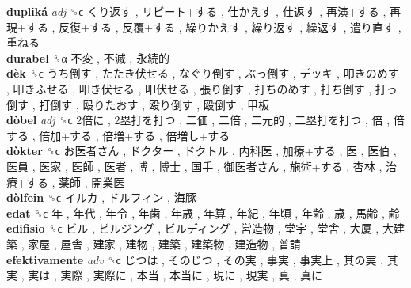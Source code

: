 \textbf{dupliká} \emph{adj}  ␝ϲ   くり返す ,  リピート+する ,  仕かえす ,  仕返す ,  再演+する ,  再現+する ,  反復+する ,  反覆+する ,  繰りかえす ,  繰り返す ,  繰返す ,  遣り直す ,  重ねる   \\
\textbf{durabel} ␝α   不変 ,  不滅 ,  永続的   \\
\textbf{dèk} ␝ϲ   うち倒す ,  たたき伏せる ,  なぐり倒す ,  ぶっ倒す ,  デッキ ,  叩きのめす ,  叩きふせる ,  叩き伏せる ,  叩伏せる ,  張り倒す ,  打ちのめす ,  打ち倒す ,  打っ倒す ,  打倒す ,  殴りたおす ,  殴り倒す ,  殴倒す ,  甲板   \\
\textbf{dòbel} \emph{adj}  ␝ϲ   2倍に ,  2塁打を打つ ,  二価 ,  二倍 ,  二元的 ,  二塁打を打つ ,  倍 ,  倍する ,  倍加+する ,  倍増+する ,  倍増し+する   \\
\textbf{dòkter} ␝ϲ   お医者さん ,  ドクター ,  ドクトル ,  内科医 ,  加療+する ,  医 ,  医伯 ,  医員 ,  医家 ,  医師 ,  医者 ,  博 ,  博士 ,  国手 ,  御医者さん ,  施術+する ,  杏林 ,  治療+する ,  薬師 ,  開業医   \\
\textbf{dòlfein} ␝ϲ   イルカ ,  ドルフィン ,  海豚   \\
\textbf{edat} ␝ϲ   年 ,  年代 ,  年令 ,  年歯 ,  年歳 ,  年算 ,  年紀 ,  年頃 ,  年齢 ,  歳 ,  馬齢 ,  齢   \\
\textbf{edifisio} ␝ϲ   ビル ,  ビルジング ,  ビルディング ,  営造物 ,  堂宇 ,  堂舎 ,  大厦 ,  大建築 ,  家屋 ,  屋舎 ,  建家 ,  建物 ,  建築 ,  建築物 ,  建造物 ,  普請   \\
\textbf{efektivamente} \emph{adv}  ␝ϲ   じつは ,  そのじつ ,  その実 ,  事実 ,  事実上 ,  其の実 ,  其実 ,  実は ,  実際 ,  実際に ,  本当 ,  本当に ,  現に ,  現実 ,  真 ,  真に   \\
